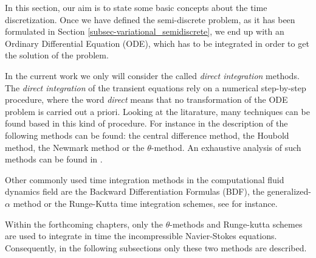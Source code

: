 In this section, our aim is to state some basic concepts about the time discretization. Once we have defined the semi-discrete problem, as it has been formulated in Section \ref{subsec-variational_semidiscrete}, we end up with an Ordinary Differential Equation (ODE), which has to be integrated in order to get the solution of the problem.

In the current work we only will consider the called \textit{direct integration} methods. The \textit{direct integration} of the transient equations rely on a numerical step-by-step procedure, where the word \textit{direct} means that no transformation of the ODE problem is carried out a priori. Looking at the litarature, many techniques can be found based in this kind of procedure. For instance in \cite{bathe_finite_2006} the description of the following methods can be found: the central difference method, the Houbold method, the Newmark method or the $ \theta $-method. An exhaustive analysis of such methods can be found in \cite{belytschko_computational_1983}.

Other commonly used time integration methods in the computational fluid dynamics field are the Backward Differentiation Formulas (BDF), the generalized-$ \alpha $ method or the Runge-Kutta time integration schemes, see \cite{brayton_new_1972, jansen_generalized-alpha_2000, dettmer_analysis_2003,hairer_solving_2008} for instance.

Within the forthcoming chapters, only the $ \theta $-methods and Runge-kutta schemes are used to integrate in time the incompressible Navier-Stokes equations. Consequently, in the following subsections only these two methods are described. 

